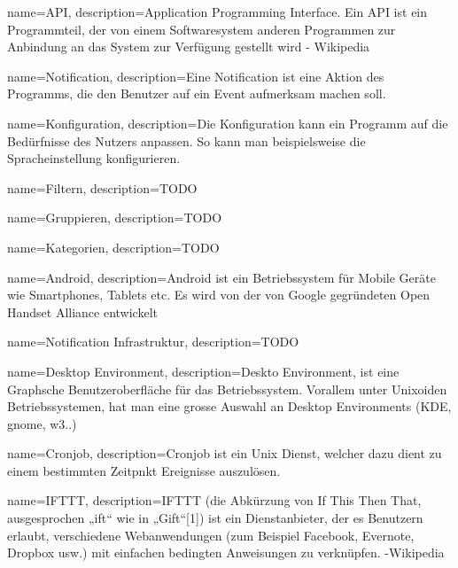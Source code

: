 {
  name=API,
  description={Application Programming Interface. Ein API ist ein Programmteil, der von einem Softwaresystem anderen
  Programmen zur Anbindung an das System zur Verfügung gestellt wird
  - Wikipedia}
} 

{
  name=Notification,
  description={Eine Notification ist eine Aktion des Programms, die den Benutzer auf ein Event aufmerksam machen soll.}
} 

{
  name=Konfiguration,
  description={Die Konfiguration kann ein Programm auf die Bedürfnisse des Nutzers anpassen. So kann man beispielsweise
   die Spracheinstellung konfigurieren.}
} 

{
  name=Filtern,
  description={TODO}
} 

{
  name=Gruppieren,
  description={TODO}
} 

{
  name=Kategorien,
  description={TODO }
} 

{
  name=Android,
  description={Android ist ein Betriebssystem für Mobile Geräte wie Smartphones, Tablets etc.
   Es wird von der von Google gegründeten Open Handset Alliance entwickelt}
}

{
  name=Notification Infrastruktur,
  description={TODO}
} 

{
  name=Desktop Environment,
  description={Deskto Environment, ist eine Graphsche Benutzeroberfläche für das Betriebssystem. Vorallem unter
  Unixoiden Betriebssystemen, hat man eine grosse Auswahl an Desktop Environments (KDE, gnome, w3..)}
} 

{
  name=Cronjob,
  description={Cronjob ist ein Unix Dienst, welcher dazu dient zu einem bestimmten Zeitpnkt Ereignisse auszulösen.}
} 



{
  name=IFTTT,
  description={IFTTT (die Abkürzung von If This Then That, ausgesprochen „ift“ wie in „Gift“[1]) ist ein Dienstanbieter,
  der es Benutzern erlaubt, verschiedene Webanwendungen (zum Beispiel Facebook, Evernote, Dropbox usw.) mit einfachen
  bedingten Anweisungen zu verknüpfen.
   -Wikipedia}
} 





